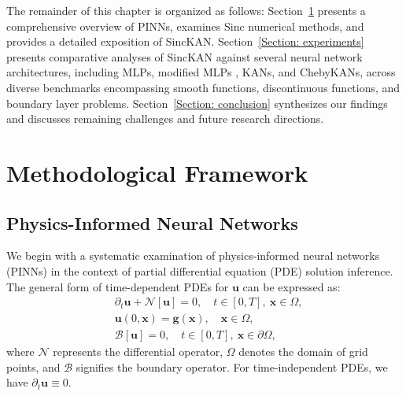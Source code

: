 The remainder of this chapter is organized as follows: Section~\ref{Section: Methods} presents a comprehensive overview of PINNs, examines Sinc numerical methods, and provides a detailed exposition of SincKAN. Section~\ref{Section: experiments} presents comparative analyses of SincKAN against several neural network architectures, including MLPs, modified MLPs \citep{wang2021understanding}, KANs, and ChebyKANs, across diverse benchmarks encompassing smooth functions, discontinuous functions, and boundary layer problems. Section~\ref{Section: conclusion} synthesizes our findings and discusses remaining challenges and future research directions.

\section{Methodological Framework}\label{Section: Methods}
\subsection{Physics-Informed Neural Networks}
We begin with a systematic examination of physics-informed neural networks (PINNs) \citep{raissi2019physics} in the context of partial differential equation (PDE) solution inference. The general form of time-dependent PDEs for $\boldsymbol{u}$ can be expressed as:
\begin{equation}
\begin{aligned}
    & \partial_{t}\boldsymbol{u}+\mathcal{N}[\boldsymbol{u}]=0, \quad t \in[0, T],\ \boldsymbol{x} \in \Omega, \\
    & \boldsymbol{u}(0, \boldsymbol{x})=\boldsymbol{g}(\boldsymbol{x}), \quad \boldsymbol{x} \in \Omega, \\
    & \mathcal{B}[\boldsymbol{u}]=0, \quad t \in[0, T],\ \boldsymbol{x} \in \partial \Omega,
\end{aligned}\label{PDE}
\end{equation}
where $\mathcal{N}$ represents the differential operator, $\Omega$ denotes the domain of grid points, and $\mathcal{B}$ signifies the boundary operator. For time-independent PDEs, we have $\partial_{t}\boldsymbol{u}\equiv 0$. 

